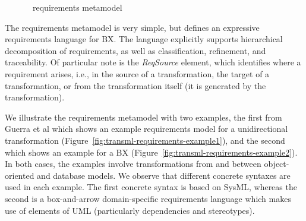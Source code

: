 \begin{figure}[htbp]
\caption{\transml\ requirements metamodel \cite{GuerraLKPS13}}
\label{fig:transml-requirements}
\end{figure}

The requirements metamodel is very simple, but defines an expressive requirements language for BX. The language explicitly supports hierarchical decomposition of requirements, as well as classification, refinement, and traceability. Of particular note is the \textit{ReqSource} element, which identifies where a requirement arises, i.e., in the source of a transformation, the target of a transformation, or from the transformation itself (it is generated by the transformation). 

We illustrate the requirements metamodel with two examples, the first from Guerra et al \cite{GuerraLKPS13} which shows an example requirements model for a unidirectional transformation (Figure~\ref{fig:transml-requirements-example1}), and the second which shows an example for a BX (Figure~\ref{fig:transml-requirements-example2}). In both cases, the examples involve transformations from and between object-oriented and database models. We observe that different concrete syntaxes are used in each example. The first concrete syntax is based on SysML, whereas the second is a box-and-arrow domain-specific requirements language which makes use of elements of UML (particularly dependencies and stereotypes).


